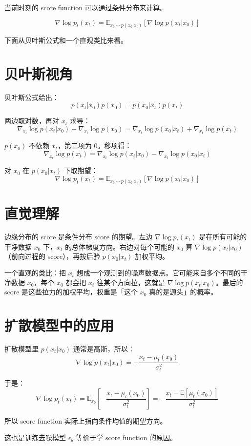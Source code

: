 当前时刻的 score function 可以通过条件分布来计算。

\[
\nabla \log p_t(x_t) = \mathbb{E}_{x_0 \sim p(x_0|x_t)}[\nabla \log p(x_t|x_0)]
\]

下面从贝叶斯公式和一个直观类比来看。

\section{贝叶斯视角}

贝叶斯公式给出： \[
p(x_t|x_0) p(x_0) = p(x_0|x_t) p(x_t)
\]

两边取对数，再对 \(x_t\) 求导： \[
\nabla_{x_t} \log p(x_t|x_0) + \nabla_{x_t} \log p(x_0) = \nabla_{x_t} \log p(x_0|x_t) + \nabla_{x_t} \log p(x_t)
\]

\(p(x_0)\) 不依赖 \(x_t\)，第二项为 0。移项得： \[
\nabla_{x_t} \log p(x_t) = \nabla_{x_t} \log p(x_t|x_0) - \nabla_{x_t} \log p(x_0|x_t)
\]

对 \(x_0\) 在 \(p(x_0|x_t)\) 下取期望： \[
\nabla \log p_t(x_t) = \mathbb{E}_{x_0 \sim p(x_0|x_t)}[\nabla \log p(x_t|x_0)]
\]

\section{直觉理解}

边缘分布的 score 是条件分布 score 的期望。左边 \(\nabla \log p_t(x_t)\) 是在所有可能的干净数据 \(x_0\) 下，\(x_t\) 的总体梯度方向。右边对每个可能的 \(x_0\) 算 \(\nabla \log p(x_t|x_0)\)（前向过程的 score），再按后验 \(p(x_0|x_t)\) 加权平均。

一个直观的类比：把 \(x_t\) 想成一个观测到的噪声数据点。它可能来自多个不同的干净数据 \(x_0\)，每个 \(x_0\) 都会把 \(x_t\) 往某个方向拉，这就是 \(\nabla \log p(x_t|x_0)\)。最后的 score 是这些拉力的加权平均，权重是「这个 \(x_0\) 真的是源头」的概率。

\section{扩散模型中的应用}

扩散模型里 \(p(x_t|x_0)\) 通常是高斯，所以： \[
\nabla \log p(x_t|x_0) = -\frac{x_t - \mu_t(x_0)}{\sigma_t^2}
\]

于是： \[
\nabla \log p_t(x_t) = \mathbb{E}_{x_0}[-\frac{x_t - \mu_t(x_0)}{\sigma_t^2}] = -\frac{x_t - \mathbb{E}[\mu_t(x_0)]}{\sigma_t^2}
\]

所以 score function 实际上指向条件均值的期望方向。

这也是训练去噪模型 \(\epsilon_\theta\) 等价于学 score function 的原因。
